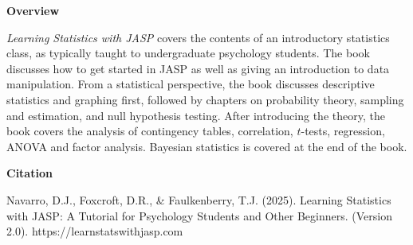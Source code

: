 

\clearpage
\newpage
\begin{center}
{\bf Overview}
\end{center}

\noindent
{\it Learning Statistics with JASP} covers the contents of an introductory statistics class, as typically taught to undergraduate psychology students. The book discusses how to get started in JASP as well as giving an introduction to data manipulation. From a statistical perspective, the book discusses descriptive statistics and graphing first, followed by chapters on probability theory, sampling and estimation, and null hypothesis testing. After introducing the theory, the book covers the analysis of contingency tables, correlation, $t$-tests, regression, ANOVA and factor analysis. Bayesian statistics is covered at the end of the book. 

\vspace{14cm}
\begin{center}
{\bf Citation}
\end{center}

\noindent
Navarro, D.J., Foxcroft, D.R., \& Faulkenberry, T.J. (2025). Learning Statistics with JASP: A Tutorial for Psychology Students and Other Beginners. (Version 2.0). https://learnstatswithjasp.com  

